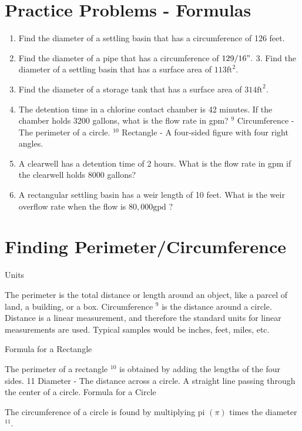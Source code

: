 \documentclass[10pt]{article}
\begin{document}
\section{Practice Problems - Formulas}
\begin{enumerate}
  \item Find the diameter of a settling basin that has a circumference of 126 feet.

  \item Find the diameter of a pipe that has a circumference of $129 / 16 " .$ 3. Find the diameter of a settling basin that has a surface area of $113 \mathrm{ft}^{2}$.

  \item Find the diameter of a storage tank that has a surface area of $314 \mathrm{ft}^{2}$.

  \item The detention time in a chlorine contact chamber is 42 minutes. If the chamber holds 3200 gallons, what is the flow rate in gpm? ${ }^{9}$ Circumference - The perimeter of a circle. ${ }^{10}$ Rectangle - A four-sided figure with four right angles.

  \item A clearwell has a detention time of 2 hours. What is the flow rate in gpm if the clearwell holds 8000 gallons?

  \item A rectangular settling basin has a weir length of 10 feet. What is the weir overflow rate when the flow is $80,000 \mathrm{gpd}$ ?

\end{enumerate}
\section{Finding Perimeter/Circumference}
Units

The perimeter is the total distance or length around an object, like a parcel of land, a building, or a box. Circumference ${ }^{9}$ is the distance around a circle. Distance is a linear measurement, and therefore the standard units for linear measurements are used. Typical samples would be inches, feet, miles, etc.

Formula for a Rectangle

The perimeter of a rectangle ${ }^{10}$ is obtained by adding the lengths of the four sides. 11 Diameter - The distance across a circle. A straight line passing through the center of a circle. Formula for a Circle

The circumference of a circle is found by multiplying pi $(\pi)$ times the diameter ${ }^{11}$.
\end{document}
